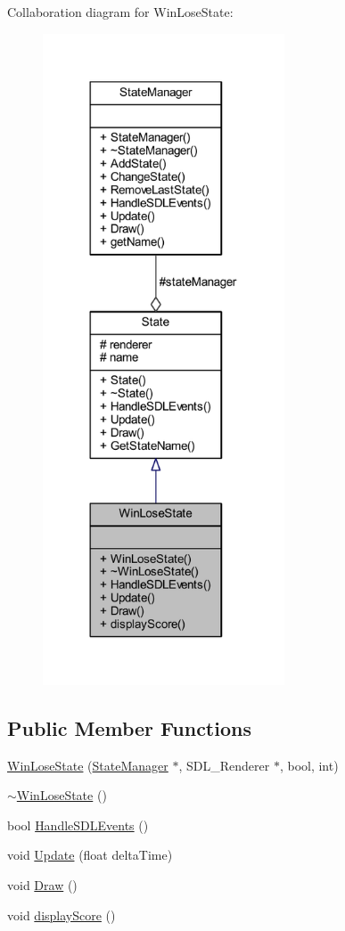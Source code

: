 Collaboration diagram for Win\+Lose\+State\+:
\nopagebreak
\begin{figure}[H]
\begin{center}
\leavevmode
\includegraphics[width=203pt]{class_win_lose_state__coll__graph}
\end{center}
\end{figure}
\subsection*{Public Member Functions}
\begin{DoxyCompactItemize}
\item 
\hyperlink{class_win_lose_state_a047ccdc0cc156d65c076eb845398ef84}{Win\+Lose\+State} (\hyperlink{class_state_manager}{State\+Manager} $\ast$, S\+D\+L\+\_\+\+Renderer $\ast$, bool, int)
\item 
\hyperlink{class_win_lose_state_ac7ee2a9515081ba03b96cb78c5837d72}{$\sim$\+Win\+Lose\+State} ()
\item 
bool \hyperlink{class_win_lose_state_ada8c41baa8011df1aeae4b7b0d9b00f8}{Handle\+S\+D\+L\+Events} ()
\item 
void \hyperlink{class_win_lose_state_a98e675ce31aa41ad95ba36fd9e77dde6}{Update} (float delta\+Time)
\item 
void \hyperlink{class_win_lose_state_a862a5bb9422480b36671acb21cc987ba}{Draw} ()
\item 
void \hyperlink{class_win_lose_state_af7a44a05cae2f79731b9e36ea1ef4f7e}{display\+Score} ()
\end{DoxyCompactItemize}

